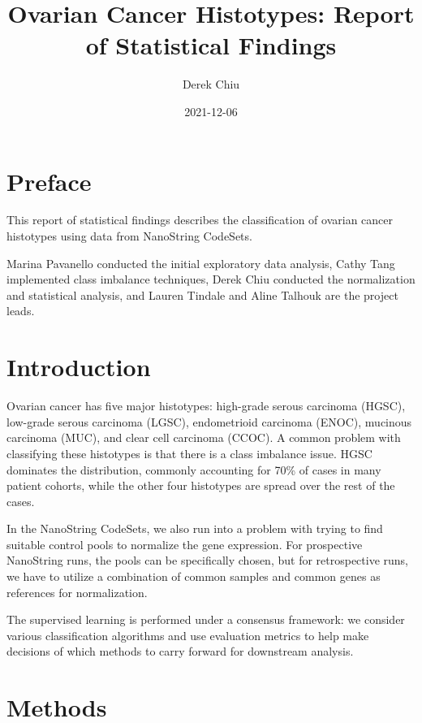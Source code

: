 \documentclass[
]{report}
\title{Ovarian Cancer Histotypes: Report of Statistical Findings}
\author{Derek Chiu}
\date{2021-12-06}
\begin{document}
\maketitle

{
\hypersetup{linkcolor=}
\setcounter{tocdepth}{1}
\tableofcontents
}
\listoftables
\listoffigures
\hypertarget{preface}{%
\chapter*{Preface}\label{preface}}

This report of statistical findings describes the classification of ovarian cancer histotypes using data from NanoString CodeSets.

Marina Pavanello conducted the initial exploratory data analysis, Cathy Tang implemented class imbalance techniques, Derek Chiu conducted the normalization and statistical analysis, and Lauren Tindale and Aline Talhouk are the project leads.

\hypertarget{introduction}{%
\chapter{Introduction}\label{introduction}}

Ovarian cancer has five major histotypes: high-grade serous carcinoma (HGSC), low-grade serous carcinoma (LGSC), endometrioid carcinoma (ENOC), mucinous carcinoma (MUC), and clear cell carcinoma (CCOC). A common problem with classifying these histotypes is that there is a class imbalance issue. HGSC dominates the distribution, commonly accounting for 70\% of cases in many patient cohorts, while the other four histotypes are spread over the rest of the cases.

In the NanoString CodeSets, we also run into a problem with trying to find suitable control pools to normalize the gene expression. For prospective NanoString runs, the pools can be specifically chosen, but for retrospective runs, we have to utilize a combination of common samples and common genes as references for normalization.

The supervised learning is performed under a consensus framework: we consider various classification algorithms and use evaluation metrics to help make decisions of which methods to carry forward for downstream analysis.

\hypertarget{methods}{%
\chapter{Methods}\label{methods}}
\end{document}
